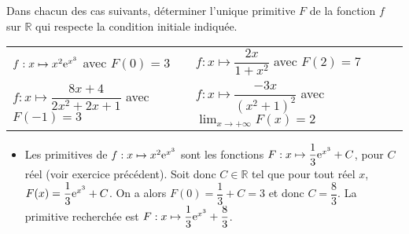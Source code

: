 \documentclass[11pt,fleqn, openany]{book} %
\begin{document}
\begin{exercise}[topic=diff02]Dans chacun des cas suivants, déterminer l'unique primitive $F$ de la fonction $f$ sur $\mathbb{R}$ qui respecte la condition initiale indiquée.

\renewcommand{\arraystretch}{2}
\begin{tabularx}{\linewidth}{XX}
 $f:x\mapsto x^2\mathrm{e}^{x^3}$  avec $F(0)=3$
&
 $f:x\mapsto \dfrac{2x}{1+x^2}$  avec $F(2)=7$
\\
 $f:x\mapsto \dfrac{8x+4}{2x^2+2x+1}$ avec $F(-1)=3$
&
 $f:x\mapsto \dfrac{-3x}{(x^2+1)^2}$  avec $\displaystyle\lim_{x \to +\infty}F(x)=2$
\end{tabularx}\end{exercise}

\begin{solution} \hspace{0pt}

\begin{itemize}
\item Les primitives de \(f:x\mapsto x^2\mathrm{e}^{x^3}\) sont les fonctions \(F:x\mapsto \dfrac{1}{3}\mathrm{e}^{x^3}+C\), pour \(C\) réel (voir exercice précédent). Soit donc \(C\in\mathbb{R}\) tel que pour tout réel \(x\), \(F(x)=  \dfrac{1}{3}\mathrm{e}^{x^3}+C\). On a alors \(F(0)=\dfrac{1}{3}+C=3\) et donc \(C=\dfrac{8}{3}\). La primitive recherchée est \(F:x\mapsto \dfrac{1}{3}\mathrm{e}^{x^3}+\dfrac{8}{3}\).

\vskip5pt


\end{itemize}
\end{solution}
\end{document}
